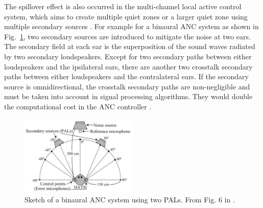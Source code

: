     The spillover effect is also occurred in the  multi-channel local active control system, which aims to create multiple quiet zones or a larger quiet zone using multiple secondary sources \cite{Nelson1992ActiveControlSound}. 
    For example for a binaural ANC system as shown in Fig.~\ref{fig:intro:tanaka2017model}, two secondary sources are introduced to mitigate the noise at two ears.
    The secondary field at each ear is the superposition of the sound waves radiated by two secondary loudspeakers.
    Except for two secondary paths between either loudspeakers and the ipsilateral ears, there are another two crosstalk secondary paths between either loudspeakers and the contralateral ears.
    If the secondary source is omnidirectional, the crosstalk secondary paths are non-negligible and must be taken into account in signal processing algorithms. 
    They would double the computational cost in the ANC controller \cite{Tanaka2017BinauralActiveNoise}.

\begin{figure}[!htb]
    \centering
    \includegraphics[width = 0.5\textwidth]{Figures/pending/Tanaka2017-Model_resize.jpg}
    \caption{Sketch of a binaural ANC system using two PALs. From Fig. 6 in \cite{Tanaka2017BinauralActiveNoise}.}
    \label{fig:intro:tanaka2017model}
\end{figure}


